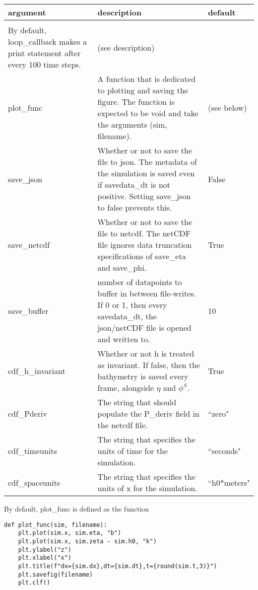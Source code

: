 \documentclass[10pt,a4paper]{article}
\newenvironment{optarglist}
    {\begin{center}
    \begin{tabular}{l|p{10cm}|l}
    argument & description & default\\
    \hline\\
    }
    { 
    \end{tabular} 
    \end{center}
    }
\begin{document}
\begin{optarglist}
                    By default, loop\_callback makes a print statement after
                    every 100 time steps. & (see description)\\\hline
        plot\_func &
                   A function that is dedicated to plotting and saving the
                    figure. The function is expected to be void and take the
                    arguments (sim, filename). & (see below)\\\hline
        save\_json &
                   Whether or not to save the file to json. The metadata of
                    the simulation is saved even if savedata\_dt is not
                    positive. Setting save\_json to false prevents this. & False\\\hline
        save\_netcdf&
                   Whether or not to save the file to netcdf. The netCDF file
                    ignores data truncation specifications of save\_eta and
                    save\_phi. & True \\\hline
        save\_buffer
                  & number of datapoints to buffer in between file-writes. If 0
                    or 1, then every savedata\_dt, the json/netCDF file is opened
                    and written to. & 10 \\\hline
        cdf\_h\_invariant
                  & Whether or not h is treated as invariant. If false, then
                    the bathymetry is saved every frame, alongside $\eta$ and
                    $\phi^S$. & True\\\hline
        cdf\_Pderiv
                  &The string that should populate the P\_deriv field in the
                    netcdf file. & ``zero"\\\hline
        cdf\_timeunits
                  & The string that specifies the units of time for the
                    simulation. & ``seconds"\\\hline
        cdf\_spaceunits
                  & The string that specifies the units of x for the
                    simulation. & ``h0*meters"
\end{optarglist}

By default, plot\_func is defined as the function

\begin{verbatim}
def plot_func(sim, filename):
    plt.plot(sim.x, sim.eta, "b")
    plt.plot(sim.x, sim.zeta - sim.h0, "k")
    plt.ylabel("z")
    plt.xlabel("x")
    plt.title(f"dx={sim.dx},dt={sim.dt},t={round(sim.t,3)}")
    plt.savefig(filename)
    plt.clf()
\end{verbatim}
\end{document}
